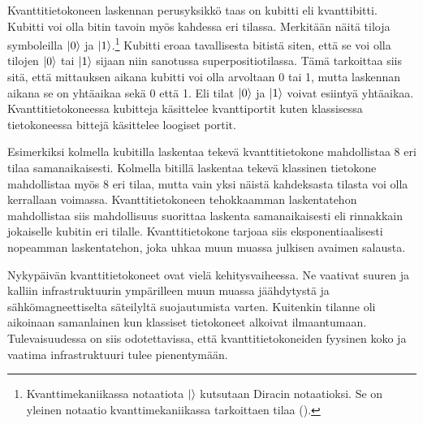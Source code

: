 Kvanttitietokoneen laskennan perusyksikkö taas on kubitti eli kvanttibitti. Kubitti voi olla bitin tavoin myös kahdessa eri tilassa. Merkitään näitä tiloja symboleilla
$\ket{0}$ ja $\ket{1}$.\footnote{Kvanttimekaniikassa notaatiota $\ket{}$ kutsutaan Diracin notaatioksi. Se on yleinen notaatio kvanttimekaniikassa tarkoittaen tilaa (\cite{nielsen2001quantum}).} Kubitti eroaa tavallisesta bitistä siten, että se voi olla tilojen $\ket{0}$ tai $\ket{1}$ sijaan niin sanotussa superpositiotilassa. Tämä tarkoittaa siis sitä, että mittauksen aikana kubitti voi olla arvoltaan 0 tai 1, mutta laskennan aikana se on yhtäaikaa sekä 0 että 1. Eli tilat $\ket{0}$ ja $\ket{1}$ voivat esiintyä yhtäaikaa. Kvanttitietokoneessa kubitteja käsittelee kvanttiportit kuten klassisessa tietokoneessa bittejä käsittelee loogiset portit.

Esimerkiksi kolmella kubitilla laskentaa tekevä kvanttitietokone mahdollistaa 8 eri tilaa samanaikaisesti. Kolmella bitillä laskentaa tekevä klassinen tietokone mahdollistaa myös 8 eri tilaa, mutta vain yksi näistä kahdeksasta tilasta voi olla kerrallaan voimassa. Kvanttitietokoneen tehokkaamman laskentatehon mahdollistaa siis mahdollisuus suorittaa laskenta samanaikaisesti eli rinnakkain jokaiselle kubitin eri tilalle. Kvanttitietokone tarjoaa siis eksponentiaalisesti nopeamman laskentatehon, joka uhkaa muun muassa julkisen avaimen salausta.

Nykypäivän kvanttitietokoneet ovat vielä kehitysvaiheessa. Ne vaativat suuren ja kalliin infrastruktuurin ympärilleen muun muassa jäähdytystä ja sähkömagneettiselta säteilyltä suojautumista varten. Kuitenkin tilanne oli aikoinaan samanlainen kun klassiset tietokoneet alkoivat ilmaantumaan. Tulevaisuudessa on siis odotettavissa, että kvanttitietokoneiden fyysinen koko ja vaatima infrastruktuuri tulee pienentymään.